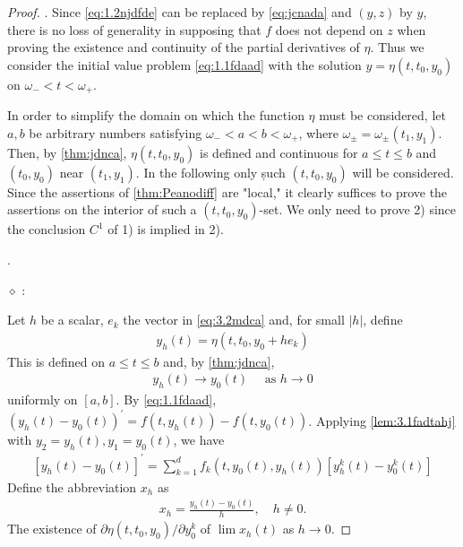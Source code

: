 \documentclass{article}
\begin{document}
\begin{proof} .
Since \cref{eq:1.2njdfde} can be replaced by \cref{eq:jcnada} and $(y, z)$ by $y$, there is no loss of generality in supposing that $f$ does not depend on $z$ when proving the existence and continuity of the partial derivatives of $\eta$. Thus we consider  the initial value problem \cref{eq:1.1fdaad} with the solution $y=\eta\left(t, t_{0}, y_{0}\right)$ on $\omega_{-}<t<\omega_{+}$.

In order to simplify the domain on which the function $\eta$ must be considered, let $a, b$ be arbitrary numbers satisfying $\omega_{-}<a<b<\omega_{+}$,  where $\omega_{\pm}=\omega_{\pm}\left(t_{1}, y_{1}\right)$. Then, by \cref{thm:jdnca}, $\eta\left(t, t_{0}, y_{0}\right)$ is defined and continuous for $a \le t \le b$ and $\left(t_{0}, y_{0}\right)$ near $\left(t_{1}, y_{1}\right)$. In the following only șuch $\left(t, t_{0}, y_{0}\right)$ will be considered. Since the assertions of \cref{thm:Peanodiff} are "local," it clearly suffices to prove the assertions on the interior of such a $\left(t, t_{0}, y_{0}\right)$-set. We only need to prove 2) since the conclusion $C^1$ of 1) is implied in 2).

.

$\diamond$ :

Let $h$ be a scalar, $e_{k}$ the vector in \cref{eq:3.2mdca} and, for small $|h|$, define
\begin{align}
y_{h}(t)=\eta\left(t, t_{0}, y_{0}+h e_{k}\right)\label{eq:ijdmar}
\end{align}
This is defined on $a \le t \le b$ and, by \cref{thm:jdnca},
\begin{align}
y_{h}(t) \rightarrow y_{0}(t) \quad \text { as } h \rightarrow 0\label{eq:3.10lodasjc}
\end{align}
uniformly on $[a, b] .$ By \cref{eq:1.1fdaad}, $\left(y_{h}(t)-y_{0}(t)\right)^{\prime}=f\left(t, y_{h}(t)\right)-f\left(t, y_{0}(t)\right)$. Applying \cref{lem:3.1fadtahj}  with $y_{2}=y_{h}(t), y_{1}=y_{0}(t)$, we have
\begin{align}
\left[y_{h}(t)-y_{0}(t)\right]^{\prime}=\sum_{k=1}^{d} f_{k}\left(t, y_{0}(t), y_{h}(t)\right)\left[y_{h}^{k}(t)-y_{0}^{k}(t)\right]\label{eq:3.11lksad}
\end{align}
Define the abbreviation $x_h$ as
\begin{align}
x_{h}=\frac{y_{h}(t)-y_{0}(t)}{h}, \quad h \neq 0 .\label{eq:3.12pade}
\end{align}
The existence of $\partial \eta\left(t, t_{0}, y_{0}\right) / \partial y_{0}^{k}$  of $\lim x_{h}(t)$ as $h \rightarrow 0$.


\end{proof}
\end{document}
